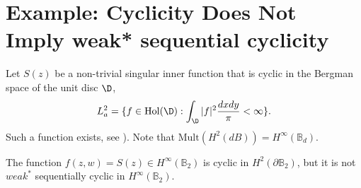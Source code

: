 \documentclass{article}
\numberwithin{equation}{section}
\newcommand{\Bd}{\mathbb B_d}
\begin{document}
\section{Example: Cyclicity Does Not Imply \texorpdfstring{weak* sequential cyclicity}{weak$^\ast$ sequential cyclicity}}
\label{Sec:Example}

Let $S(z)$ be a  non-trivial singular inner function that is cyclic in the Bergman space of the unit disc $\D$, $$L^{2}_{a}=\{f\in \mathrm{Hol}(\D): \int_{\D}|f|^2 \frac{dxdy}{\pi}<\infty\}.$$ Such a function exists, see  \cite{KorenblumBeurlingtype, Korenblumcyclicelements, Robertscyclicinner}). Note that $\mathrm{Mult}(H^2(dB))=H^\infty(\Bd)$.

\begin{thm} The function $f(z,w)=S(z)\in H^\infty(\mathbb B_2)$ is cyclic in $H^2(\partial \mathbb B_2)$, but it is not $weak^\ast$ sequentially cyclic in $H^\infty(\mathbb B_2)$. 
\end{thm}
\end{document}
